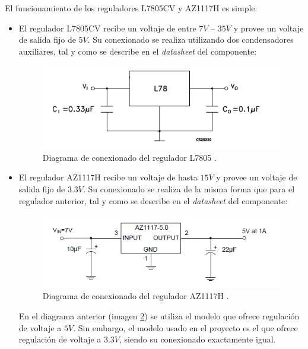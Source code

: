 El funcionamiento de los reguladores L7805CV y AZ1117H es simple:
\begin{itemize}
    \item El regulador L7805CV recibe un voltaje de entre $7V$ -- $35V$ y provee un voltaje de salida fijo de $5V$. Su conexionado se realiza utilizando dos condensadores auxiliares, tal y como se describe en el \textit{datasheet} del componente:
    
    \begin{figure}[H]
    \centering 
    \includegraphics[width=.75\linewidth]{pictures/L7805Datasheet.PNG}
    \caption{Diagrama de conexionado del regulador L7805 \cite{noauthor_L7805CV_nodate}.}
    \label{fig:L7805_Conexionado}
    \end{figure}
    
    \item El regulador AZ1117H recibe un voltaje de hasta $15V$ y provee un voltaje de salida fijo de $3.3V$. Su conexionado se realiza de la misma forma que para el regulador anterior, tal y como se describe en el \textit{datasheet} del componente:
    
    \begin{figure}[H]
    \centering 
    \includegraphics[width=.75\linewidth]{pictures/AZ1117Hdatasheet.PNG}
    \caption{Diagrama de conexionado del regulador AZ1117H \cite{noauthor_AZ1117H_nodate}.}
    \label{fig:AZ1117H_Conexionado}
    \end{figure}
    
    En el diagrama anterior (imagen \ref{fig:AZ1117H_Conexionado}) se utiliza el modelo que ofrece regulación de voltaje a $5V$. Sin embargo, el modelo usado en el proyecto es el que ofrece regulación de voltaje a $3.3V$, siendo su conexionado exactamente igual.
    
\end{itemize}

